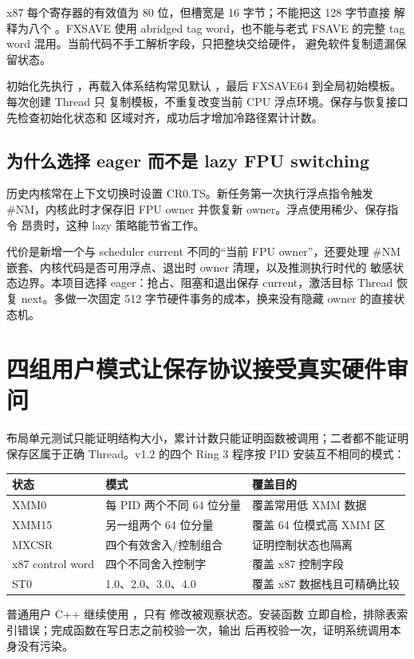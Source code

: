 x87 每个寄存器的有效值为 80 位，但槽宽是 16 字节；不能把这 128 字节直接
解释为八个 。FXSAVE 使用 abridged tag word，也不能与老式
FSAVE 的完整 tag word 混用。当前代码不手工解析字段，只把整块交给硬件，
避免软件复制遗漏保留状态。

初始化先执行 ，再载入体系结构常见默认
，最后 FXSAVE64 到全局初始模板。每次创建 Thread 只
复制模板，不重复改变当前 CPU 浮点环境。保存与恢复接口先检查初始化状态和
区域对齐，成功后才增加冷路径累计计数。

\subsection{为什么选择 eager 而不是 lazy FPU switching}

历史内核常在上下文切换时设置 CR0.TS。新任务第一次执行浮点指令触发
\#NM，内核此时才保存旧 FPU owner 并恢复新 owner。浮点使用稀少、保存指令
昂贵时，这种 lazy 策略能节省工作。

代价是新增一个与 scheduler current 不同的“当前 FPU owner”，还要处理
\#NM 嵌套、内核代码是否可用浮点、退出时 owner 清理，以及推测执行时代的
敏感状态边界。本项目选择 eager：抢占、阻塞和退出保存 current，激活目标
Thread 恢复 next。多做一次固定 512 字节硬件事务的成本，换来没有隐藏 owner
的直接状态机。

\section{四组用户模式让保存协议接受真实硬件审问}

布局单元测试只能证明结构大小，累计计数只能证明函数被调用；二者都不能证明
保存区属于正确 Thread。v1.2 的四个 Ring 3 程序按 PID 安装互不相同的模式：

\begin{longtable}{L{0.19\textwidth}L{0.27\textwidth}L{0.42\textwidth}}
\toprule
状态 & 模式 & 覆盖目的\\
\midrule
XMM0 & 每 PID 两个不同 64 位分量 & 覆盖常用低 XMM 数据\\
XMM15 & 另一组两个 64 位分量 & 覆盖 64 位模式高 XMM 区\\
MXCSR & 四个有效舍入/控制组合 & 证明控制状态也隔离\\
x87 control word & 四个不同舍入控制字 & 覆盖 x87 控制字段\\
ST0 & 1.0、2.0、3.0、4.0 & 覆盖 x87 数据栈且可精确比较\\
\bottomrule
\end{longtable}

普通用户 C++ 继续使用 ，只有
 修改被观察状态。安装函数
立即自检，排除表索引错误；完成函数在写日志之前校验一次，输出
 后再校验一次，证明系统调用本身没有污染。

